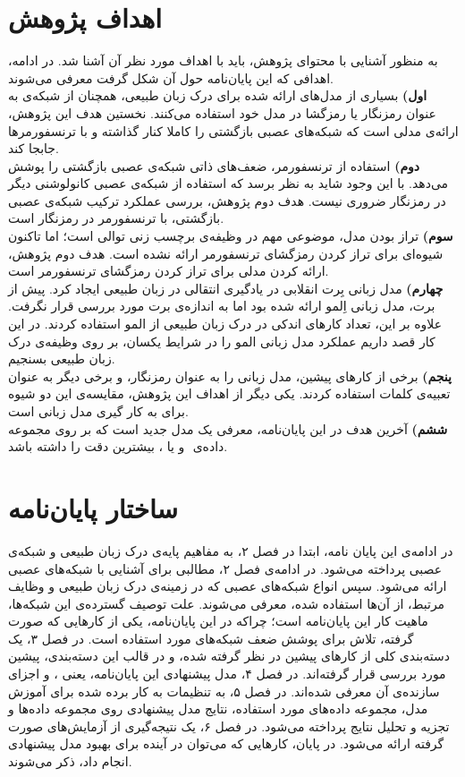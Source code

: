 \section{اهداف پژوهش}
به منظور آشنایی با محتوای پژوهش، باید با اهداف مورد نظر آن آشنا شد. در ادامه، اهدافی که این پایان‌نامه حول آن شکل گرفت معرفی می‌شوند.\\
\textbf{اول) }بسیاری از مدل‌های ارائه شده برای درک زبان طبیعی، همچنان از شبکه‌ی  به عنوان رمزنگار یا رمزگشا در مدل خود استفاده می‌کنند. نخستین هدف این پژوهش، ارائه‌ی مدلی است که شبکه‌های عصبی بازگشتی را کاملا کنار گذاشته و با ترنسفورمرها جابجا کند.\\
\textbf{دوم) }استفاده از ترنسفورمر، ضعف‌های ذاتی شبکه‌ی عصبی بازگشتی را پوشش می‌دهد. با این وجود شاید به نظر برسد که استفاده از شبکه‌ی عصبی کانولوشنی دیگر در رمزنگار ضروری نیست. هدف دوم پژوهش، بررسی عملکرد ترکیب شبکه‌ی عصبی بازگشتی، با ترنسفورمر در رمزنگار است.\\
\textbf{سوم) }تراز بودن مدل، موضوعی مهم در وظیفه‌ی برچسب زنی توالی است؛ اما تاکنون شیوه‌ای برای تراز کردن رمزگشای ترنسفورمر ارائه نشده است. هدف دوم پژوهش، ارائه کردن مدلی برای تراز کردن رمزگشای ترنسفورمر است.\\
\textbf{چهارم) }مدل زبانی بِرت انقلابی در یادگیری انتقالی در زبان طبیعی ایجاد کرد. پیش از برت، مدل زبانی اِلمو ارائه شده بود اما به اندازه‌ی برت مورد بررسی قرار نگرفت. علاوه بر این، تعداد کارهای اندکی در درک زبان طبیعی از المو استفاده کردند. در این کار قصد داریم عملکرد مدل زبانی المو را در شرایط یکسان، بر روی وظیفه‌ی درک زبان طبیعی بسنجیم. \\
\textbf{پنجم)} برخی از کارهای پیشین، مدل زبانی را به عنوان رمزنگار، و برخی دیگر به عنوان تعبیه‌ی کلمات استفاده کردند. یکی دیگر از اهداف این پژوهش، مقایسه‌ی این دو شیوه برای به کار گیری مدل زبانی است.\\
\textbf{ششم)} آخرین هدف در این پایان‌نامه، معرفی یک مدل جدید است که بر روی مجموعه داده‌ی ‌ و یا ، بیشترین دقت را داشته باشد.
\section{ساختار پایان‌نامه}
در ادامه‌ی این پایان نامه، ابتدا در فصل ۲، به مفاهیم پایه‌ی درک زبان طبیعی و شبکه‌ی عصبی پرداخته می‌شود. در ادامه‌ی فصل ۲، مطالبی برای آشنایی با شبکه‌های عصبی ارائه می‌شود. سپس انواع شبکه‌های عصبی که در زمینه‌ی درک زبان طبیعی و وظایف مرتبط، از آن‌ها استفاده شده، معرفی می‌شوند. علت توصیف گسترده‌ی این شبکه‌ها، ماهیت کار این پایان‌نامه است؛ چراکه در این پایان‌نامه، یکی از کارهایی که صورت گرفته، تلاش برای پوشش ضعف شبکه‌های مورد استفاده است. در فصل ۳، یک دسته‌بندی کلی از کارهای پیشین در نظر گرفته شده، و در قالب این دسته‌بندی، پیشین مورد بررسی قرار گرفته‌اند. در فصل ۴،  مدل پیشنهادی این پایان‌نامه، یعنی ، و اجزای سازنده‌ی آن معرفی شده‌اند. در فصل ۵، به تنظیمات به کار برده شده برای آموزش مدل، مجموعه داده‌های مورد استفاده، نتایج مدل پیشنهادی روی مجموعه داده‌ها و تجزیه و تحلیل نتایج پرداخته می‌شود. در فصل ۶، یک نتیجه‌گیری از آزمایش‌های صورت گرفته ارائه می‌شود. در پایان، کارهایی که می‌توان در آینده برای بهبود مدل پیشنهادی انجام داد، ذکر می‌شوند.


